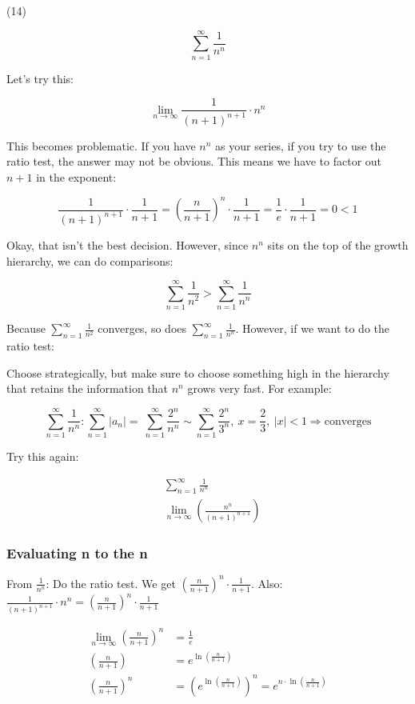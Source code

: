 \documentclass[12pt]{article}
\theoremstyle{plain}
\theoremstyle{remark}
\theoremstyle{definition}
\begin{document}
(14)

\[\sum_{n = 1}^{\infty}\frac{1}{n^{n}}\]

Let's try this:

\[\lim_{n \rightarrow \infty}{\frac{1}{(n + 1)^{n + 1}} \cdot n^{n}}\]

This becomes problematic. If you have \(n^{n}\) as your series, if you
try to use the ratio test, the answer may not be obvious. This means we
have to factor out \(n + 1\) in the exponent:

\[\frac{1}{(n + 1)^{n + 1}} \cdot \frac{1}{n + 1} = \left( \frac{n}{n + 1} \right)^{n} \cdot \frac{1}{n + 1} = \frac{1}{e} \cdot \frac{1}{n + 1} = 0 < 1\]

Okay, that isn't the best decision. However, since \(n^{n}\) sits on the
top of the growth hierarchy, we can do comparisons:

\[\sum_{n = 1}^{\infty}\frac{1}{n^{2}} > \sum_{n = 1}^{\infty}\frac{1}{n^{n}}\]

Because \(\sum_{n = 1}^{\infty}\frac{1}{n^{2}}\) converges, so does
\(\sum_{n = 1}^{\infty}\frac{1}{n^{n}}\). However, if we want to do the
ratio test:

Choose strategically, but make sure to choose something high in the
hierarchy that retains the information that \(n^{n}\) grows very fast.
For example:

\[{\sum_{n = 1}^{\infty}\frac{1}{n^{n}}:\sum_{n = 1}^{\infty}\left| a_{n} \right| }{= \ \sum_{n = 1}^{\infty}\frac{2^{n}}{n^{n}}\sim\sum_{n = 1}^{\infty}\frac{2^{n}}{3^{n}},\ x }{= \frac{2}{3},\ |x| < 1 \Rightarrow \text{conver}\text{ges}} \]

Try this again:

\begin{align*}
&\sum_{n = 1}^{\infty}\frac{1}{n^{n}} \\
&\lim_{n \rightarrow \infty}\left( \frac{n^{n}}{(n + 1)^{n + 1}} \right)
\end{align*}



\subsubsection{Evaluating n to the n}

From \(\frac{1}{n^{n}}\): Do the ratio test. We get
\(\left( \frac{n}{n + 1} \right)^{n} \cdot \frac{1}{n + 1}\). Also:
\(\frac{1}{(n + 1)^{n + 1}} \cdot n^{n} = \left( \frac{n}{n + 1} \right)^{n} \cdot \frac{1}{n + 1}\)

\begin{align*}
\lim_{n \rightarrow \infty}\left( \frac{n}{n + 1} \right)^{n} &= \frac{1}{e} \\
\left( \frac{n}{n + 1} \right) &= e^{\ln\left( \frac{n}{n + 1} \right)} \\
\left( \frac{n}{n + 1} \right)^{n} &= \left( e^{\ln\left( \frac{n}{n + 1} \right)} \right)^{n} = e^{n \cdot \ln\left( \frac{n}{n + 1} \right)}
\end{align*}
\end{document}
